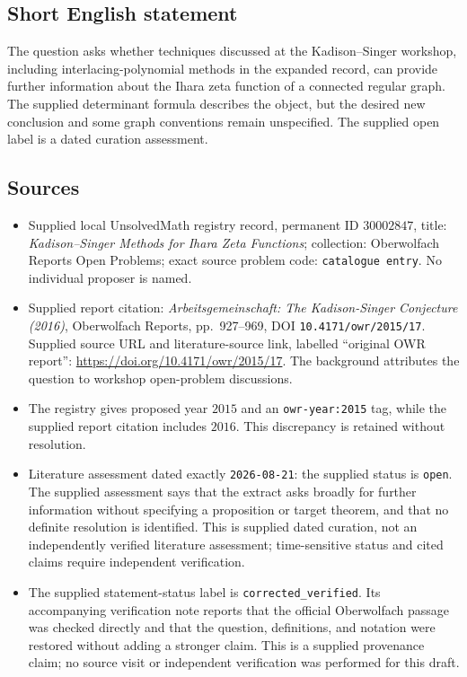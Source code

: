 \documentclass[11pt]{article}
\begin{document}
\subsection{Short English statement}
The question asks whether techniques discussed at the Kadison--Singer workshop, including interlacing-polynomial methods in the expanded record, can provide further information about the Ihara zeta function of a connected regular graph. The supplied determinant formula describes the object, but the desired new conclusion and some graph conventions remain unspecified. The supplied open label is a dated curation assessment.
\subsection{Sources}
\begin{itemize}
\item Supplied local UnsolvedMath registry record, permanent ID \(30002847\), title: \emph{Kadison--Singer Methods for Ihara Zeta Functions}; collection: Oberwolfach Reports Open Problems; exact source problem code: \texttt{catalogue entry}. No individual proposer is named.
\item Supplied report citation: \emph{Arbeitsgemeinschaft: The Kadison-Singer Conjecture (2016)}, Oberwolfach Reports, pp.\ 927--969, DOI \texttt{10.4171/owr/2015/17}. Supplied source URL and literature-source link, labelled ``original OWR report'': \url{https://doi.org/10.4171/owr/2015/17}. The background attributes the question to workshop open-problem discussions.
\item The registry gives proposed year \(2015\) and an \texttt{owr-year:2015} tag, while the supplied report citation includes \(2016\). This discrepancy is retained without resolution.
\item Literature assessment dated exactly \texttt{2026-08-21}: the supplied status is \texttt{open}. The supplied assessment says that the extract asks broadly for further information without specifying a proposition or target theorem, and that no definite resolution is identified. This is supplied dated curation, not an independently verified literature assessment; time-sensitive status and cited claims require independent verification.
\item The supplied statement-status label is \texttt{corrected\_verified}. Its accompanying verification note reports that the official Oberwolfach passage was checked directly and that the question, definitions, and notation were restored without adding a stronger claim. This is a supplied provenance claim; no source visit or independent verification was performed for this draft.
\end{itemize}
\end{document}
